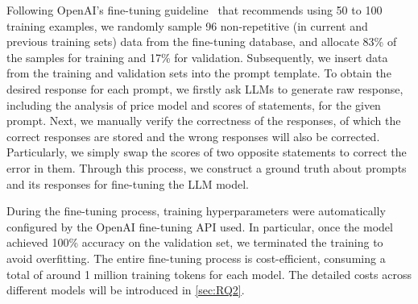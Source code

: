 
Following OpenAI's fine-tuning guideline~\cite{OpenAI_Fine-tuning} that recommends using 50 to 100 training examples, we randomly sample 96 non-repetitive (in current and previous training sets) data from the fine-tuning database, and allocate 83\% of the samples for training and 17\% for validation.
Subsequently, we insert data from the training and validation sets into the prompt template.
To obtain the desired response for each prompt, we firstly ask LLMs to generate raw response, including the analysis of price model and scores of statements, for the given prompt. 
Next, we manually verify the correctness of the responses, of which the correct responses are stored and the wrong responses will also be corrected. Particularly, we simply swap the scores of two opposite statements to correct the error in them.
Through this process, we construct a ground truth about prompts and its responses for fine-tuning the LLM model.

During the fine-tuning process, training hyperparameters were automatically configured by the OpenAI fine-tuning API used.
In particular, once the model achieved 100\% accuracy on the validation set, we terminated the training to avoid overfitting. The entire fine-tuning process is cost-efficient, consuming a total of around 1 million training tokens for each model.
The detailed costs across different models will be introduced in \mysec\ref{sec:RQ2}.


